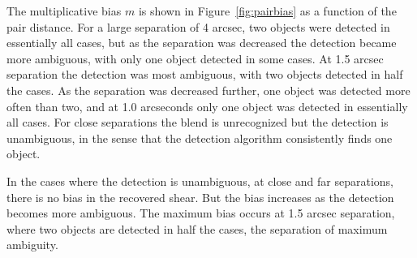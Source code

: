 \documentclass[iop, twocolappendix, appendixfloats, numberedappendix, apj]{hackemulateapj}
\begin{document}
The multiplicative bias $m$ is shown in Figure~\ref{fig:pairbias} as a function
of the pair distance. For a large separation of 4 arcsec, two objects were
detected in essentially all cases, but as the separation was decreased the
detection became more ambiguous, with only one object detected in some cases.
At 1.5 arcsec separation the detection was most ambiguous, with two objects
detected in half the cases. As the separation was decreased further, one object
was detected more often than two, and at 1.0 arcseconds only one object was
detected in essentially all cases.  For close separations the blend is
unrecognized but the detection is unambiguous, in the sense that the
detection algorithm consistently finds one object.

In the cases where the detection is unambiguous, at close and far separations,
there is no bias in the recovered shear.  But the bias increases as the
detection becomes more ambiguous. The maximum bias occurs at 1.5 arcsec
separation, where two objects are detected in half the cases, the separation of
maximum ambiguity.
\end{document}
